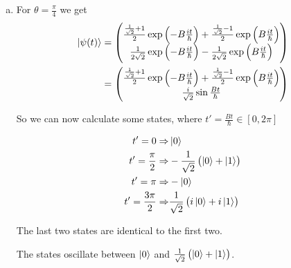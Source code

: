 \documentclass[a4paper,german,12pt,smallheadings]{scrartcl}
\newcommand\pgfmathsinandcos[3]{%
  \pgfmathsetmacro#1{sin(#3)}%
  \pgfmathsetmacro#2{cos(#3)}%
}
\newcommand\LongitudePlane[3][current plane]{%
  \pgfmathsinandcos\sinEl\cosEl{#2} %
  \pgfmathsinandcos\sint\cost{#3} %
  \tikzset{#1/.estyle={cm={\cost,\sint*\sinEl,0,\cosEl,(0,0)}}}
}
\newcommand\LatitudePlane[3][current plane]{%
  \pgfmathsinandcos\sinEl\cosEl{#2} %
  \pgfmathsinandcos\sint\cost{#3} %
  \pgfmathsetmacro\yshift{\cosEl*\sint}
  \tikzset{#1/.estyle={cm={\cost,0,0,\cost*\sinEl,(0,\yshift)}}} %
}
\newcommand\DrawLongitudeCircle[2][1]{
  \LongitudePlane{\angEl}{#2}
  \tikzset{current plane/.prefix style={scale=#1}}
  \pgfmathsetmacro\angVis{atan(sin(#2)*cos(\angEl)/sin(\angEl))} %
  \draw[current plane] (\angVis:1) arc (\angVis:\angVis+180:1);
  \draw[current plane,dashed] (\angVis-180:1) arc (\angVis-180:\angVis:1);
}
\newcommand\DrawLatitudeCircle[2][1]{
  \LatitudePlane{\angEl}{#2}
  \tikzset{current plane/.prefix style={scale=#1}}
  \pgfmathsetmacro\sinVis{sin(#2)/cos(#2)*sin(\angEl)/cos(\angEl)}
  \pgfmathsetmacro\angVis{asin(min(1,max(\sinVis,-1)))}
  \draw[current plane] (\angVis:1) arc (\angVis:-\angVis-180:1);
  \draw[current plane,dashed] (180-\angVis:1) arc (180-\angVis:\angVis:1);
}
\begin{document}
\begin{enumerate}[a)]
  \item
    For $\theta = \frac{\pi}{4}$ we get
    \begin{align*}
      \ket{\psi(t)} &= 
      \begin{pmatrix}
        \frac{\frac{1}{\sqrt{2}} + 1}{2} \exp\del{-B\frac{it}{\hbar}} + \frac{\frac{1}{\sqrt{2}} - 1}{2} \exp\del{B\frac{it}{\hbar}} \\
        \frac{1}{2\sqrt{2}} \exp\del{-B\frac{it}{\hbar}} - \frac{1}{2\sqrt{2}} \exp\del{B\frac{it}{\hbar}}
      \end{pmatrix} \\
      &= 
      \begin{pmatrix}
        \frac{\frac{1}{\sqrt{2}} + 1}{2} \exp\del{-B\frac{it}{\hbar}} + \frac{\frac{1}{\sqrt{2}} - 1}{2} \exp\del{B\frac{it}{\hbar}} \\
        \frac{i}{\sqrt{2}} \sin  \frac{Bt}{\hbar}
      \end{pmatrix}
    \end{align*}

    So we can now calculate some states, where $t' = \frac{Bt}{\hbar} \in [0, 2\pi]$

    \begin{align*}
      t' = 0 \Rightarrow             &\ket{0} \\
      t' = \frac{\pi}{2} \Rightarrow &-\frac{1}{\sqrt{2}}\del{\ket{0} + \ket{1}} \\
      t' = \pi \Rightarrow &-\ket{0} \\
      t' = \frac{3\pi}{2} \Rightarrow &\frac{1}{\sqrt{2}}\del{i\ket{0} + i\ket{1}} \\
    \end{align*}

    The last two states are identical to the first two.




The states oscillate between $\ket{0}$ and $\frac{1}{\sqrt{2}} \del{\ket{0} + \ket{1}}$.



\end{enumerate}
\end{document}
